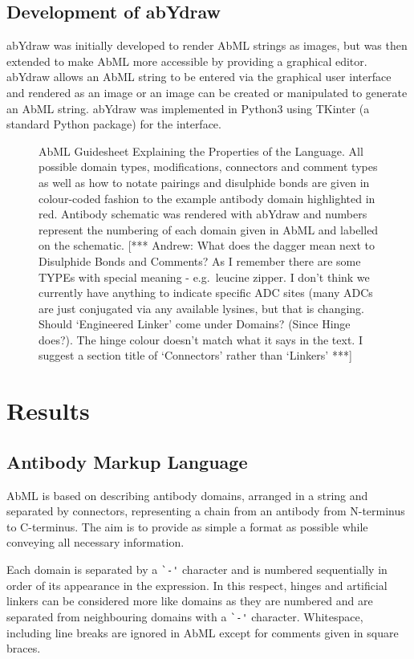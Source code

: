 \documentclass[a4paper]{article}
\newcommand{\andrew}[1]{{\color{red} [*** Andrew: #1 ***]}}
\begin{document}
\subsection{Development of abYdraw}
abYdraw was initially developed to render AbML strings as images, but
was then extended to make AbML more accessible by providing a
graphical editor. abYdraw allows an AbML string to be entered via
the graphical user interface and rendered as an image or an image can
be created or manipulated to generate an AbML string.
abYdraw was implemented in Python3 using TKinter (a standard Python
package) for the interface.


\begin{figure}
\caption{\label{fig:1} AbML Guidesheet Explaining the Properties of
the Language. All possible domain types, modifications, connectors and
comment types as well as how to notate pairings and disulphide bonds
are given in colour-coded fashion to the example antibody domain
highlighted in red. Antibody schematic was rendered with abYdraw and
numbers represent the numbering of each domain given in AbML and
labelled on the schematic. \andrew{What does the dagger mean next
  to Disulphide Bonds and Comments? As I remember there are some
  TYPEs with special meaning - e.g.\ leucine zipper. I don't think
  we currently have anything to indicate specific ADC sites (many
  ADCs are just conjugated via any available lysines, but that is
  changing. Should `Engineered Linker' come under Domains? (Since
  Hinge does?). The hinge colour doesn't match what it says in the
  text. I suggest a section title of `Connectors' rather than
  `Linkers'}}
\end{figure}

\section{Results}

\subsection{Antibody Markup Language}
AbML is based on describing antibody domains, arranged in a string and
separated by connectors, representing a chain from an antibody
from N-terminus to C-terminus. The aim is to provide as simple a format
as possible while conveying all necessary information.

Each domain is separated by a
\verb|`-'| character and is numbered sequentially in
order of its appearance in the expression. 
In this respect, hinges and artificial linkers can be considered more
like domains as they are numbered and are separated from neighbouring
domains with a \verb|`-'| character.
Whitespace, including line breaks are ignored in AbML
except for comments given in square braces.
\end{document}
